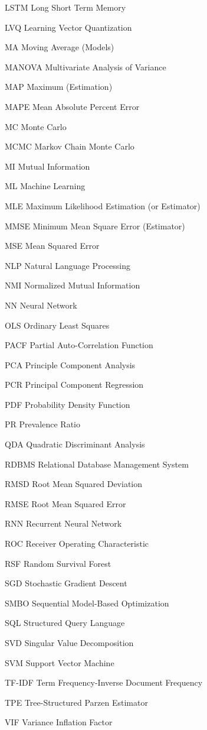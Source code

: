 \begin{symbollist}
  \item[LSTM] Long Short Term Memory
  \item[LVQ] Learning Vector Quantization
  \item[MA] Moving Average (Models)
  \item[MANOVA] Multivariate Analysis of Variance
  \item[MAP] Maximum \aposteriori (Estimation)
  \item[MAPE] Mean Absolute Percent Error
  \item[MC] Monte Carlo
  \item[MCMC] Markov Chain Monte Carlo
  \item[MI] Mutual Information
  \item[ML] Machine Learning
  \item[MLE] Maximum Likelihood Estimation (or Estimator)
  \item[MMSE] Minimum Mean Square Error (Estimator)
  \item[MSE] Mean Squared Error
  \item[NLP] Natural Language Processing
  \item[NMI] Normalized Mutual Information
  \item[NN] Neural Network
  \item[OLS] Ordinary Least Squares
  \item[PACF] Partial Auto-Correlation Function
  \item[PCA] Principle Component Analysis
  \item[PCR] Principal Component Regression
  \item[PDF] Probability Density Function
  \item[PR] Prevalence Ratio
  \item[QDA] Quadratic Discriminant Analysis
  \item[RDBMS] Relational Database Management System
  \item[RMSD] Root Mean Squared Deviation
  \item[RMSE] Root Mean Squared Error
  \item[RNN] Recurrent Neural Network
  \item[ROC] Receiver Operating Characteristic
  \item[RSF] Random Survival Forest
  \item[SGD] Stochastic Gradient Descent
  \item[SMBO] Sequential Model-Based Optimization
  \item[SQL] Structured Query Language
  \item[SVD] Singular Value Decomposition
  \item[SVM] Support Vector Machine
  \item[TF-IDF] Term Frequency-Inverse Document Frequency
  \item[TPE] Tree-Structured Parzen Estimator
  \item[VIF] Variance Inflation Factor
\end{symbollist}
